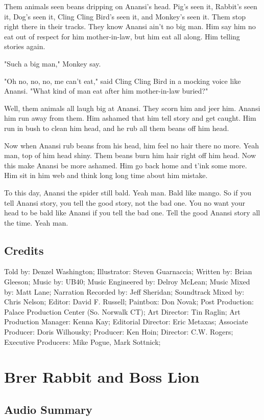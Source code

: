 Them animals seen beans dripping on Anansi's head. Pig's seen it, Rabbit's seen it, Dog's seen it, Cling Cling Bird's seen it, and Monkey's seen it. Them stop right there in their tracks. They know Anansi ain't no big man. Him say him no eat out of respect for him mother-in-law, but him eat all along. Him telling stories again.

"Such a big man," Monkey say.

"Oh no, no, no, me can't eat," said Cling Cling Bird in a mocking voice like Anansi. "What kind of man eat after him mother-in-law buried?"

Well, them animals all laugh big at Anansi. They scorn him and jeer him. Anansi him run away from them. Him ashamed that him tell story and get caught. Him run in bush to clean him head, and he rub all them beans off him head.

Now when Anansi rub beans from his head, him feel no hair there no more. Yeah man, top of him head shiny. Them beans burn him hair right off him head. Now this make Anansi be more ashamed. Him go back home and t'ink some more. Him sit in him web and think long long time about him mistake.

To this day, Anansi the spider still bald. Yeah man. Bald like mango. So if you tell Anansi story, you tell the good story, not the bad one. You no want your head to be bald like Anansi if you tell the bad one. Tell the good Anansi story all the time. Yeah man.

\subsection{Credits}

Told by: Denzel Washington;
Illustrator: Steven Guarnaccia;
Written by: Brian Gleeson;
Music by: UB40;
Music Engineered by: Delroy McLean;
Music Mixed by: Matt Lane;
Narration Recorded by: Jeff Sheridan;
Soundtrack Mixed by: Chris Nelson;
Editor: David F. Russell;
Paintbox: Don Novak;
Post Production: Palace Production Center (So. Norwalk CT);
Art Director: Tin Raglin;
Art Production Manager: Kenna Kay;
Editorial Director: Eric Metaxas;
Associate Producer: Doris Wilhousky;
Producer: Ken Hoin;
Director: C.W. Rogers;
Executive Producers: Mike Pogue, Mark Sottnick;

\section{Brer Rabbit and Boss Lion}

\subsection{Audio Summary}


